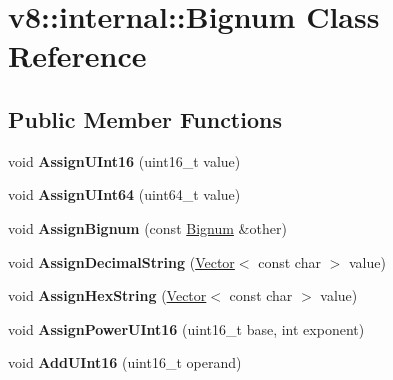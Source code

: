 \hypertarget{classv8_1_1internal_1_1_bignum}{}\section{v8\+:\+:internal\+:\+:Bignum Class Reference}
\label{classv8_1_1internal_1_1_bignum}
\subsection*{Public Member Functions}
\begin{DoxyCompactItemize}
\item 
\hypertarget{classv8_1_1internal_1_1_bignum_a4494bf1b9c7019cbf4e4f68e5db6530f}{}void {\bfseries Assign\+U\+Int16} (uint16\+\_\+t value)\label{classv8_1_1internal_1_1_bignum_a4494bf1b9c7019cbf4e4f68e5db6530f}

\item 
\hypertarget{classv8_1_1internal_1_1_bignum_aa6b480a8b87a4d88f12c70e5e5e29cc9}{}void {\bfseries Assign\+U\+Int64} (uint64\+\_\+t value)\label{classv8_1_1internal_1_1_bignum_aa6b480a8b87a4d88f12c70e5e5e29cc9}

\item 
\hypertarget{classv8_1_1internal_1_1_bignum_a579dd1d065e3dd01c596b230c150b6b0}{}void {\bfseries Assign\+Bignum} (const \hyperlink{classv8_1_1internal_1_1_bignum}{Bignum} \&other)\label{classv8_1_1internal_1_1_bignum_a579dd1d065e3dd01c596b230c150b6b0}

\item 
\hypertarget{classv8_1_1internal_1_1_bignum_a7815f04f794492a92c30a495e1a1f9ab}{}void {\bfseries Assign\+Decimal\+String} (\hyperlink{classv8_1_1internal_1_1_vector}{Vector}$<$ const char $>$ value)\label{classv8_1_1internal_1_1_bignum_a7815f04f794492a92c30a495e1a1f9ab}

\item 
\hypertarget{classv8_1_1internal_1_1_bignum_a6768408361ec5bf75c6be7bfc06de11a}{}void {\bfseries Assign\+Hex\+String} (\hyperlink{classv8_1_1internal_1_1_vector}{Vector}$<$ const char $>$ value)\label{classv8_1_1internal_1_1_bignum_a6768408361ec5bf75c6be7bfc06de11a}

\item 
\hypertarget{classv8_1_1internal_1_1_bignum_a780344bc5af94ce23ad33cd2a7a9d497}{}void {\bfseries Assign\+Power\+U\+Int16} (uint16\+\_\+t base, int exponent)\label{classv8_1_1internal_1_1_bignum_a780344bc5af94ce23ad33cd2a7a9d497}

\item 
\hypertarget{classv8_1_1internal_1_1_bignum_ac7ff62980b1599577a60d292076fd0df}{}void {\bfseries Add\+U\+Int16} (uint16\+\_\+t operand)\label{classv8_1_1internal_1_1_bignum_ac7ff62980b1599577a60d292076fd0df}


\end{DoxyCompactItemize}
